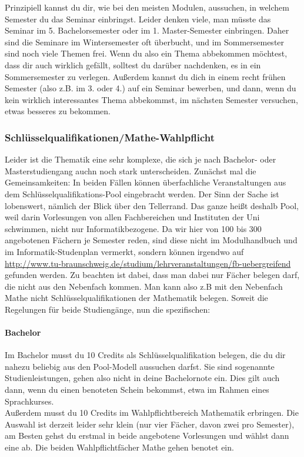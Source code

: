 \begin{multicols}{2}
Prinzipiell kannst du dir, wie bei den meisten Modulen, aussuchen, in welchem Semester du das Seminar einbringst. Leider denken viele, man müsste das Seminar im 5. Bachelorsemester oder im 1. Master-Semester einbringen. Daher sind die Seminare im Wintersemester oft überbucht, und im Sommersemester sind noch viele Themen frei. Wenn du also ein Thema abbekommen möchtest, dass dir auch wirklich gefällt, solltest du darüber nachdenken, es in ein Sommersemester zu verlegen. Außerdem kannst du dich in einem recht frühen Semester (also z.B. im 3. oder 4.) auf ein Seminar bewerben, und dann, wenn du kein wirklich interessantes Thema abbekommst, im nächsten Semester versuchen, etwas besseres zu bekommen.

\subsubsection{Schlüsselqualifikationen/Mathe-Wahlpflicht}
Leider ist die Thematik eine sehr komplexe, die sich je nach Bachelor-
oder Masterstudiengang auchn noch stark unterscheiden. Zunächst mal
die Gemeinsamkeiten: In beiden Fällen können überfachliche
Veranstaltungen aus dem Schlüsselqualifikations-Pool eingebracht
werden. Der Sinn der Sache ist lobenswert, nämlich der Blick über den
Tellerrand.  Das ganze heißt deshalb Pool, weil darin
Vorlesungen von allen Fachbereichen und Instituten der Uni schwimmen,
nicht nur Informatikbezogene. Da wir hier von 100 bis 300 angebotenen
Fächern je Semester reden, sind diese nicht im Modulhandbuch und im
Informatik-Studenplan vermerkt, sondern können irgendwo auf
\url{http://www.tu-braunschweig.de/studium/lehrveranstaltungen/fb-uebergreifend}
gefunden werden.   Zu beachten ist dabei, dass man dabei
nur Fächer belegen darf, die nicht aus den Nebenfach kommen. Man kann
also z.B mit den Nebenfach Mathe nicht Schlüsselqualifikationen der
Mathematik belegen. 
Soweit die Regelungen für beide Studiengänge, nun die spezifischen:

\paragraph*{Bachelor}
Im Bachelor musst du 10 Credits als Schlüsselqualifikation belegen,
die du dir nahezu beliebig aus den Pool-Modell aussuchen darfst. Sie
sind sogenannte Studienleistungen, gehen also nicht in deine
Bachelornote ein. Dies gilt auch dann, wenn du einen benoteten Schein
bekommst, etwa im Rahmen eines Sprachkurses.\\
Außerdem musst du 10 Credits im Wahlpflichtbereich Mathematik
erbringen. Die Auswahl ist derzeit leider sehr klein (nur vier
Fächer, davon zwei pro Semester), am Besten gehst du erstmal in beide
angebotene Vorlesungen und wählst dann eine ab. Die beiden
Wahlpflichtfächer Mathe gehen benotet ein.


\end{multicols}
